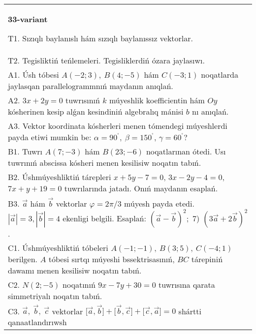 \documentclass{article}
\begin{document}
\begin{tabular}{m{17cm}}
\textbf{33-variant}
\newline

T1. 
Sızıqlı baylanıslı hám sızıqlı baylanıssız vektorlar.
 \\
T2. 
Tegisliktiń teńlemeleri. Tegisliklerdiń ózara jaylasıwı.
 \\
A1. 
Úsh tóbesi $A(-2;3), \ B(4;-5)$ hám
$C(-3;1)$ noqatlarda jaylasqan parallelogrammnıń maydanın anıqlań.
 \\
A2. 
$3x+2y=0$ tuwrısınıń $k$ múyeshlik
koefficientin hám $Oy$ kósherinen kesip alǵan kesindiniń algebralıq
mánisi $b$ nı anıqlań.
 \\
A3. 
Vektor koordinata kósherleri menen tómendegi múyeshlerdi payda etiwi
mumkin be: $\alpha = 90^{{^\circ}},\ \beta = 150^{{^\circ}}$,
$\gamma = 60^{{^\circ}}?$ 
 \\
B1. 
Tuwrı \(A(7;-3)\) hám \(B(23;-6)\) noqatlarınan ótedi.
Usı tuwrınıń abscissa kósheri menen kesilisiw noqatın tabıń.
 \\
B2. 
Úshmúyeshliktiń tárepleri \(x+5y-7=0\),
\(3x-2y-4=0\), \(7x+y+19=0\) tuwrılarında jatadı. Onıń
maydanın esaplań.
 \\
B3. 
$\vec{a}$ hám $\vec{b}$ vektorlar $\varphi = 2\pi/3$ múyesh payda etedi. $|\vec{a}| = 3,|\vec{b}| = 4$ ekenligi belgili. Esaplań: 
$(\vec{a} - \vec{b}) ^{2};$ 7) $(3\vec{a} + 2\vec{b}) ^{2}$.
 \\
C1. 
Úshmúyeshliktiń tóbeleri
\(A( - 1; - 1),\ B(3;5),\ C( - 4;1)\) berilgen. $A$ tóbesi sırtqı
múyeshi bssektrisasınıń, $BC$ tárepiniń dawamı menen kesilisiw
noqatın tabıń.
 \\
C2. 
\(N(2; - 5)\) noqatınıń \(9x - 7y + 30 = 0\) tuwrısına
qarata simmetriyalı noqatın tabıń.
 \\
C3. 
\(\vec{a},\ \vec{b},\ \vec{c}\) vektorlar \(\lbrack\vec{a},\vec{b}\rbrack + \lbrack\vec{b},\vec{c}\rbrack + \lbrack\vec{c},\vec{a}\rbrack = 0\) shártti qanaatlandırıwsh
 \\

\end{tabular}
\vspace{1cm}
\end{document}
